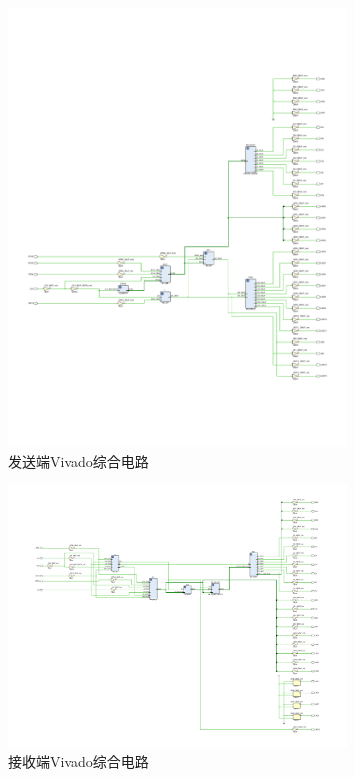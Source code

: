 \documentclass[UTF8]{ctexart}
\numberwithin{figure}{subsection}
\numberwithin{table}{subsection}
\numberwithin{equation}{subsection}
\begin{document}
\begin{figure}[H]
    \begin{center}
        \includegraphics[width=0.8\textwidth]{pics/DataSR/sender schematic.pdf}
    \end{center}
    \caption{发送端Vivado综合电路}
    \label{send synth circuit}
\end{figure}

\begin{figure}[H]
    \begin{center}
        \includegraphics[width=0.8\textwidth]{pics/DataSR/receiver schematic.pdf}
    \end{center}
    \caption{接收端Vivado综合电路}
    \label{receiver synth circuit}
\end{figure}
\end{document}
